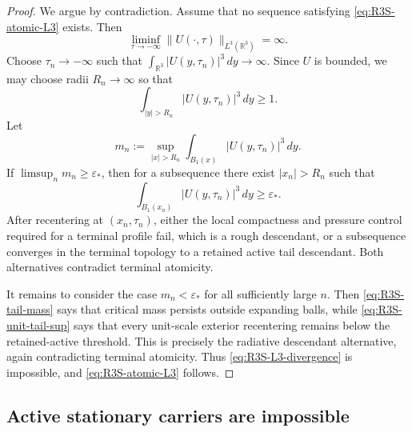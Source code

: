 \begin{proof}
We argue by contradiction.  Assume that no sequence satisfying
\eqref{eq:R3S-atomic-L3} exists.  Then
\begin{equation}\label{eq:R3S-L3-divergence}
   \liminf_{\tau\to-\infty}\|U(\cdot,\tau)\|_{L^3(\mathbb R^3)}=\infty .
\end{equation}
Choose \(\tau_n\to-\infty\) such that
\(
   \int_{\mathbb R^3}|U(y,\tau_n)|^3\,dy\to\infty .
\)
Since \(U\) is bounded, we may choose radii \(R_n\to\infty\) so that
\begin{equation}\label{eq:R3S-tail-mass}
   \int_{|y|>R_n}|U(y,\tau_n)|^3\,dy\ge 1 .
\end{equation}
Let
\begin{equation}\label{eq:R3S-unit-tail-sup}
   m_n:=\sup_{|x|>R_n}\int_{B_1(x)}|U(y,\tau_n)|^3\,dy .
\end{equation}
If \(\limsup_n m_n\ge\varepsilon_*\), then for a subsequence there exist
\(|x_n|>R_n\) such that
\begin{equation}\label{eq:R3S-active-tail-cube}
   \int_{B_1(x_n)}|U(y,\tau_n)|^3\,dy\ge \varepsilon_* .
\end{equation}
After recentering at \((x_n,\tau_n)\), either the local compactness and pressure
control required for a terminal profile fail, which is a rough descendant, or a
subsequence converges in the terminal topology to a retained active tail
descendant.  Both alternatives contradict terminal atomicity.

It remains to consider the case \(m_n<\varepsilon_*\) for all sufficiently large
\(n\).  Then \eqref{eq:R3S-tail-mass} says that critical mass persists outside
expanding balls, while \eqref{eq:R3S-unit-tail-sup} says that every unit-scale
exterior recentering remains below the retained-active threshold.  This is precisely the
radiative descendant alternative, again contradicting terminal atomicity.
Thus \eqref{eq:R3S-L3-divergence} is impossible, and
\eqref{eq:R3S-atomic-L3} follows.
\end{proof}

\subsection{Active stationary carriers are impossible}

